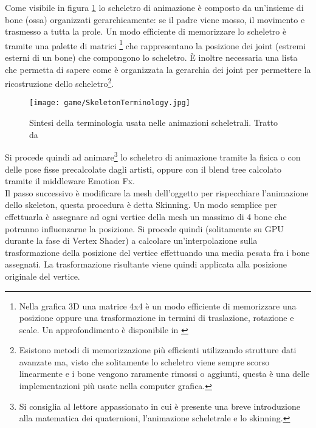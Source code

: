 	Come visibile in figura \ref{fig:SkeletonTerminology} lo scheletro di animazione è composto da un'insieme di bone (ossa) organizzati gerarchicamente: se il padre viene mosso, il movimento e trasmesso a tutta la prole. Un modo efficiente di memorizzare lo scheletro è tramite una palette di matrici \footnote{Nella grafica 3D una matrice 4x4 è un modo efficiente di memorizzare una posizione oppure una trasformazione in termini di traslazione, rotazione e scale. Un approfondimento è disponibile in \cite[chp.~3]{inbook:directx-book}} che rappresentano la posizione dei joint (estremi esterni di un bone) che compongono lo scheletro. È inoltre necessaria una lista che permetta di sapere come è organizzata la gerarchia dei joint per permettere la ricostruzione dello scheletro\footnote{Esistono metodi di memorizzazione più efficienti utilizzando strutture dati avanzate ma, visto che solitamente lo scheletro viene sempre scorso linearmente e i bone vengono raramente rimossi o aggiunti, questa è una delle implementazioni più usate nella computer grafica.}.\\
	
	\begin{figure}[h!] 
		\centering
		\texttt{[image: game/SkeletonTerminology.jpg]}
		\caption[Sintesi della terminologia usata nelle animazioni scheletrali]{Sintesi della terminologia usata nelle animazioni scheletrali. Tratto da \cite{site:skeleton-terminoligy}}
		\label{fig:SkeletonTerminology}
	\end{figure}
	
	
	Si procede quindi ad animare\footnote{Si consiglia al lettore appassionato \cite[chp.~24, 25]{inbook:directx-book} in cui è presente una breve introduzione alla matematica dei quaternioni, l'animazione scheletrale e lo skinning.} lo scheletro di animazione tramite la fisica o con delle pose fisse precalcolate dagli artisti, oppure con il blend tree calcolato tramite il middleware Emotion Fx.\\
	
	Il passo successivo è modificare la mesh dell'oggetto per rispecchiare l'animazione dello skeleton, questa procedura è detta Skinning. Un modo semplice per effettuarla è assegnare ad ogni vertice della mesh un massimo di 4 bone che potranno influenzarne la posizione. Si procede quindi (solitamente su GPU durante la fase di Vertex Shader) a calcolare un'interpolazione sulla trasformazione della posizione del vertice effettuando una media pesata fra i bone assegnati. La trasformazione risultante viene quindi applicata alla posizione originale del vertice.\\
	
